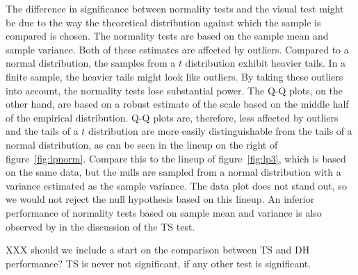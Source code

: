 \documentclass{article}\usepackage[]{graphicx}\usepackage[]{color}
\newcommand{\hh}[1]{{\color{magenta} #1}}
\begin{document}
The difference in significance between normality tests and the visual test might be due to the way the theoretical distribution against which the sample is compared is chosen. The normality tests are based on the sample mean and sample variance. Both of these estimates are affected by outliers. Compared to a normal distribution, the samples from a $t$ distribution exhibit heavier tails. In a finite sample, the heavier tails might look like outliers. By taking these outliers into account, the normality tests lose substantial power. The Q-Q plots, on the other hand, are based on a robust estimate of the scale based on the middle half of the empirical distribution. Q-Q plots are, therefore, less affected by outliers and the tails of a $t$ distribution are more easily distinguishable from the tails of a normal distribution, as can be seen in the lineup on the right of figure~\ref{fig:lpnorm}. Compare this to the lineup of figure~\ref{fig:lp3}, which is based on the same data, but the nulls are sampled from a normal distribution with a variance estimated as the sample variance. The data plot does not stand out, so we would not reject the null hypothesis based on this lineup. 
An inferior performance of normality tests based on sample mean and variance is also observed by \cite{buja:2013} in the discussion of the TS test. 

\hh{XXX should we include a start on the comparison between TS and DH performance? TS is never not significant, if any other test is significant. }
\end{document}
